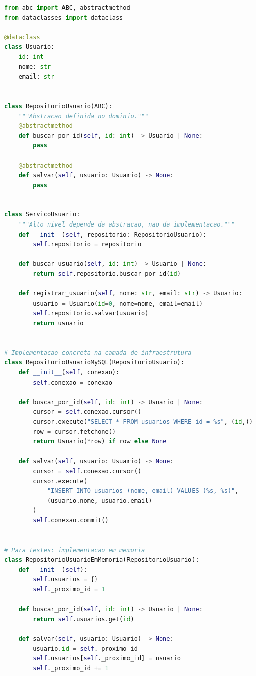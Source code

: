 \begin{lstlisting}[language=Python, caption={DIP aplicado: dependência em abstrações}]
from abc import ABC, abstractmethod
from dataclasses import dataclass

@dataclass
class Usuario:
    id: int
    nome: str
    email: str


class RepositorioUsuario(ABC):
    """Abstracao definida no dominio."""
    @abstractmethod
    def buscar_por_id(self, id: int) -> Usuario | None:
        pass

    @abstractmethod
    def salvar(self, usuario: Usuario) -> None:
        pass


class ServicoUsuario:
    """Alto nivel depende da abstracao, nao da implementacao."""
    def __init__(self, repositorio: RepositorioUsuario):
        self.repositorio = repositorio

    def buscar_usuario(self, id: int) -> Usuario | None:
        return self.repositorio.buscar_por_id(id)

    def registrar_usuario(self, nome: str, email: str) -> Usuario:
        usuario = Usuario(id=0, nome=nome, email=email)
        self.repositorio.salvar(usuario)
        return usuario


# Implementacao concreta na camada de infraestrutura
class RepositorioUsuarioMySQL(RepositorioUsuario):
    def __init__(self, conexao):
        self.conexao = conexao

    def buscar_por_id(self, id: int) -> Usuario | None:
        cursor = self.conexao.cursor()
        cursor.execute("SELECT * FROM usuarios WHERE id = %s", (id,))
        row = cursor.fetchone()
        return Usuario(*row) if row else None

    def salvar(self, usuario: Usuario) -> None:
        cursor = self.conexao.cursor()
        cursor.execute(
            "INSERT INTO usuarios (nome, email) VALUES (%s, %s)",
            (usuario.nome, usuario.email)
        )
        self.conexao.commit()


# Para testes: implementacao em memoria
class RepositorioUsuarioEmMemoria(RepositorioUsuario):
    def __init__(self):
        self.usuarios = {}
        self._proximo_id = 1

    def buscar_por_id(self, id: int) -> Usuario | None:
        return self.usuarios.get(id)

    def salvar(self, usuario: Usuario) -> None:
        usuario.id = self._proximo_id
        self.usuarios[self._proximo_id] = usuario
        self._proximo_id += 1
\end{lstlisting}

